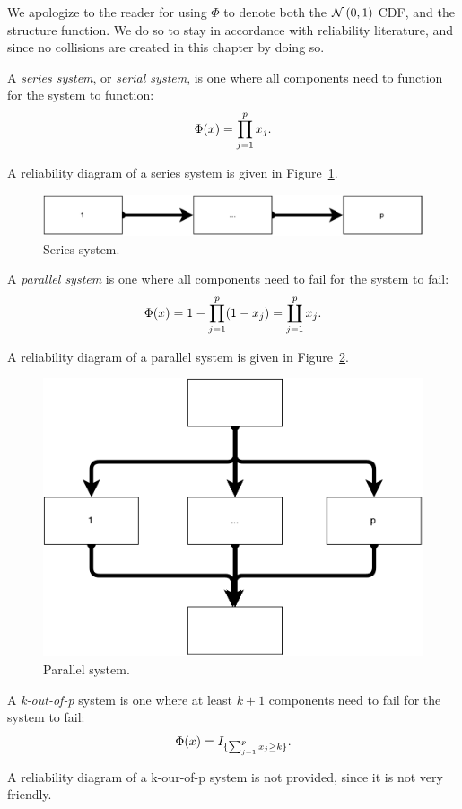 \begin{remark}[$\Phi$]
We apologize to the reader for using $\Phi$ to denote both the $\mathcal{N}\left(0,1\right)$ CDF, and the structure function.
We do so to stay in accordance with reliability literature, and since no collisions are created in this chapter by doing so.
\end{remark}

\begin{definition}
A \emph{series system}, or \emph{serial system}, is one where all components need to function for the system to function: $$\Phi(x)=\prod_{j=1}^{p}x_j.$$
\end{definition}
A reliability diagram of a series system is given in Figure~\ref{fig:series_system}.
\begin{figure}[ht]
\centering
\includegraphics[width=0.5\linewidth]{art/series_system}
\caption{Series system.}
\label{fig:series_system}
\end{figure}


\begin{definition}
A \emph{parallel system} is one where all components need to fail for the system to fail:
$$\Phi(x)=1-\prod_{j=1}^{p} (1-x_j)= \coprod_{j=1}^p x_j.$$
\end{definition}
A reliability diagram of a parallel system is given in Figure~\ref{fig:parallel_system}.
\begin{figure}[ht]
\centering
\includegraphics[width=0.5\linewidth]{art/parallel_system}
\caption{Parallel system.}
\label{fig:parallel_system}
\end{figure}


\begin{definition}
A \emph{k-out-of-p} system is one where at least $k+1$ components need to fail for the system to fail:
$$\Phi(x)=I_{\{ \sum_{j=1}^{p} x_j \geq k \}}.$$
\end{definition}
A reliability diagram of a k-our-of-p system is not provided, since it is not very friendly.




